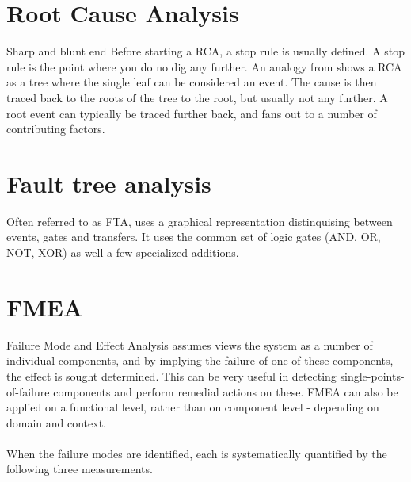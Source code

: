 \documentclass[10pt,oneside]{book}                  %
\begin{document}
\cite{hollnagel2005joint}%

\section{Root Cause Analysis}
Sharp and blunt end
Before starting a RCA, a stop rule is usually defined. A stop rule is the point where you do no dig any further. An analogy from \cite{hollnagel2004barriers} shows a RCA as a tree where the single leaf can be considered an event. The cause is then traced back to the roots of the tree to the root, but usually not any further. A root event can typically be traced further back, and fans out to a number of contributing factors.


\section{Fault tree analysis}
\label{sec:fault_tree_analysis}
Often referred to as FTA, uses a graphical representation distinquising between events, gates and transfers. It uses the common set of logic gates (AND, OR, NOT, XOR) as well a few specialized additions.

\section{FMEA}
Failure Mode and Effect Analysis assumes views the system as a number of individual components, and by implying the failure of one of these components, the effect is sought determined. This can be very useful in detecting single-points-of-failure components and perform remedial actions on these. FMEA can also be applied on a functional level, rather than on component level - depending on domain and context.\\
\\
When the failure modes are identified, each is systematically quantified by the following three measurements.
\end{document}
